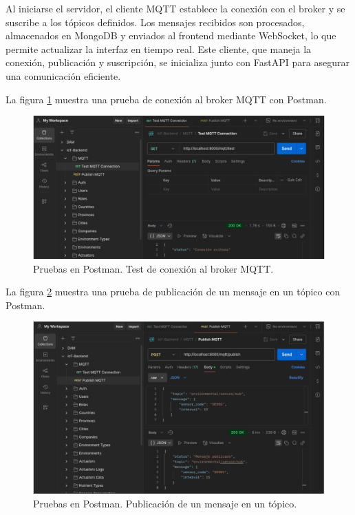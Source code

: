 Al iniciarse el servidor, el cliente MQTT establece la conexión con el broker y
se suscribe a los tópicos definidos. Los mensajes recibidos son procesados,
almacenados en MongoDB y enviados al frontend mediante WebSocket, lo que
permite actualizar la interfaz en tiempo real. Este cliente, que maneja la
conexión, publicación y suscripción, se inicializa junto con FastAPI para
asegurar una comunicación eficiente.

La figura \ref{fig:test_mqtt} muestra una prueba de conexión al broker MQTT con
Postman.

\begin{figure}[H]
    \centering
    \includegraphics[width=.99\textwidth]{./Images/19.png}
    \caption{Pruebas en Postman. Test de conexión al broker MQTT.}
    \label{fig:test_mqtt}
\end{figure}

La figura \ref{fig:test_mqtt_1} muestra una prueba de publicación de un mensaje
en un tópico con Postman.

\begin{figure}[H]
    \centering
    \includegraphics[width=.99\textwidth]{./Images/20.png}
    \caption{Pruebas en Postman. Publicación de un mensaje en un tópico.}
    \label{fig:test_mqtt_1}
\end{figure}

